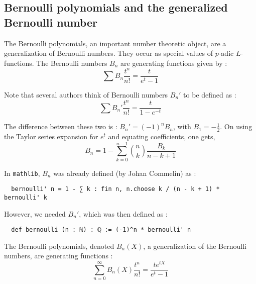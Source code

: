 \documentclass[a4paper,UKenglish,cleveref, autoref, thm-restate]{lipics-v2021}
\newcommand{\lean}[1]{\texttt{#1}\xspace} %
\begin{document}

\subsection{Bernoulli polynomials and the generalized Bernoulli number}
The Bernoulli polynomials, an important number theoretic object, are a generalization of
Bernoulli numbers. They occur as special values
of $p$-adic $L$-functions. The Bernoulli numbers $B_n$ are generating functions given by :
$$\sum B_n\frac{t^n}{n!}=\frac{t}{e^{t} - 1}$$

Note that several authors think of Bernoulli numbers $B_n'$ to be defined as :
$$\sum B_n'\frac{t^n}{n!}=\frac{t}{1-e^{-t}}$$

The difference between these two is : $B_n' = (-1)^n B_n$, with $B_1 = - \frac{1}{2}$.
On using the Taylor series expansion for $e^t$ and equating coefficients, one gets,
$$ B_n = 1 - \sum_{k = 0}^{n - 1} {n \choose k} \frac{B_k}{n - k + 1} $$

In \lean{mathlib}, $B_n$ was already defined (by Johan Commelin) as :
\begin{lstlisting}
  bernoulli' n = 1 - ∑ k : fin n, n.choose k / (n - k + 1) * bernoulli' k
\end{lstlisting}
However, we needed $B_n'$, which was then defined as :
\begin{lstlisting}
  def bernoulli (n : ℕ) : ℚ := (-1)^n * bernoulli' n
\end{lstlisting}

The Bernoulli polynomials, denoted $B_n(X)$, a generalization of the Bernoulli numbers,
are generating functions :
$$ \sum_{n = 0}^{\infty} B_n(X) \frac{t^n}{n!} = \frac{t e^{tX}}{e^t - 1} $$
\end{document}
